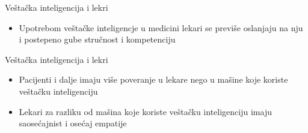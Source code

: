 \documentclass[14pt, aspectratio=169]{beamer}
\begin{document}
\begin{frame}{Veštačka inteligencija i lekri}
    \begin{itemize}
        \item Upotrebom veštačke inteligencje u medicini lekari se previše oslanjaju na nju i postepeno gube stručnost i kompetenciju
    \end{itemize}
\end{frame}


\begin{frame}{Veštačka inteligencija i lekri}
    \begin{itemize}
        \item Pacijenti i dalje imaju više poveranje u lekare nego u mašine koje koriste veštačku inteligenciju
        \item Lekari za razliku od mašina koje koriste veštačku inteligenciju imaju saosećajnist i osećaj empatije
    \end{itemize}
\end{frame}
\end{document}
